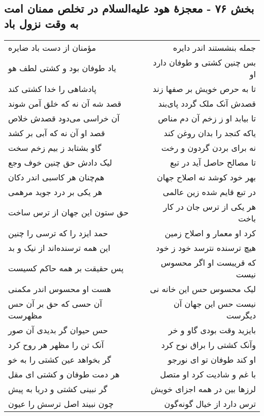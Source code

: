 \begin{center}
\section*{بخش ۷۶ - معجزهٔ هود علیه‌السلام در تخلص ممنان امت به وقت نزول باد}
\label{sec:sh076}
\begin{longtable}{l p{0.5cm} r}
مؤمنان از دست باد ضایره
&&
جمله بنشستند اندر دایره
\\
یاد طوفان بود و کشتی لطف هو
&&
بس چنین کشتی و طوفان دارد او
\\
پادشاهی را خدا کشتی کند
&&
تا به حرص خویش بر صفها زند
\\
قصد شه آن نه که خلق آمن شوند
&&
قصدش آنک ملک گردد پای‌بند
\\
آن خراسی می‌دود قصدش خلاص
&&
تا بیابد او ز زخم آن دم مناص
\\
قصد او آن نه که آبی بر کشد
&&
یاکه کنجد را بدان روغن کند
\\
گاو بشتابد ز بیم زخم سخت
&&
نه برای بردن گردون و رخت
\\
لیک دادش حق چنین خوف وجع
&&
تا مصالح حاصل آید در تبع
\\
هم‌چنان هر کاسبی اندر دکان
&&
بهر خود کوشد نه اصلاح جهان
\\
هر یکی بر درد جوید مرهمی
&&
در تبع قایم شده زین عالمی
\\
حق ستون این جهان از ترس ساخت
&&
هر یکی از ترس جان در کار باخت
\\
حمد ایزد را که ترسی را چنین
&&
کرد او معمار و اصلاح زمین
\\
این همه ترسنده‌اند از نیک و بد
&&
هیچ ترسنده نترسد خود ز خود
\\
پس حقیقت بر همه حاکم کسیست
&&
که قریبست او اگر محسوس نیست
\\
هست او محسوس اندر مکمنی
&&
لیک محسوس حس این خانه نی
\\
آن حسی که حق بر آن حس مظهرست
&&
نیست حس این جهان آن دیگرست
\\
حس حیوان گر بدیدی آن صور
&&
بایزید وقت بودی گاو و خر
\\
آنک تن را مظهر هر روح کرد
&&
وآنک کشتی را براق نوح کرد
\\
گر بخواهد عین کشتی را به خو
&&
او کند طوفان تو ای نورجو
\\
هر دمت طوفان و کشتی ای مقل
&&
با غم و شادیت کرد او متصل
\\
گر نبینی کشتی و دریا به پیش
&&
لرزها بین در همه اجزای خویش
\\
چون نبیند اصل ترسش را عیون
&&
ترس دارد از خیال گونه‌گون
\\

\end{longtable}
\end{center}
